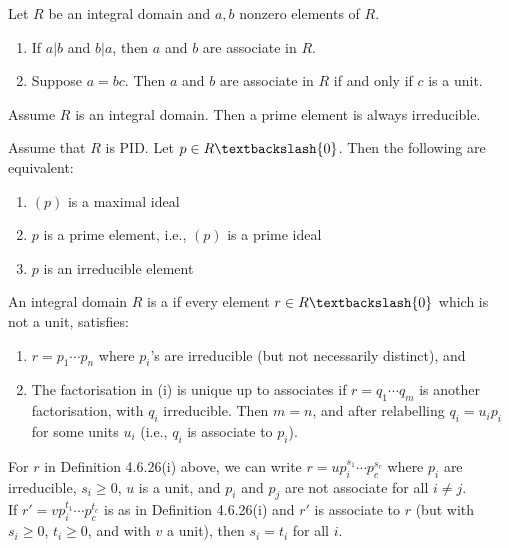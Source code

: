 \begin{proposition}
Let $R$ be an integral domain and $a,b$ nonzero elements of $R$.	
\begin{enumerate}[label=(\roman*)]
\item If $a|b$ and $b|a$, then $a$ and $b$ are associate in $R$.
\item Suppose $a=bc$. Then $a$ and $b$ are associate in $R$ if and only if $c$ is a unit.
\end{enumerate}
\end{proposition}

\begin{proposition}
Assume $R$ is an integral domain. Then a prime element is always irreducible.	
\end{proposition}

\begin{proposition}
Assume that $R$ is PID. Let $p \in R \textbackslash \{0\}$. Then the following are equivalent:
\begin{enumerate}[label=(\roman*)]
\item $(p)$ is a maximal ideal
\item $p$ is a prime element, i.e., $(p)$ is a prime ideal
\item $p$ is an irreducible element
\end{enumerate}
\end{proposition}

\begin{definition}
An integral domain $R$ is a  if every element $r \in R \textbackslash \{0\}$ which is not a unit, satisfies:
\begin{enumerate}[label=(\roman*)]
\item {} $r=p_1 \cdots p_n$ where $p_i$'s are irreducible (but not necessarily distinct), and
\item {} The factorisation in (i) is unique up to associates if $r=q_1 \cdots q_m$ is another factorisation, with $q_i$ irreducible. Then $m=n$, and after relabelling $q_i = u_i p_i$ for some units $u_i$ (i.e., $q_i$ is associate to $p_i$).
\end{enumerate}
\end{definition}

\begin{proposition}
For $r$ in Definition 4.6.26(i) above, we can write $r=u p_i^{s_1} \cdots p_c^{s_c}$ where $p_i$ are irreducible, $s_i \geq 0$, $u$ is a unit, and $p_i$ and $p_j$ are not associate for all $i \neq j$.\\
If $r'=v p_i^{t_1} \cdots p_c^{t_c}$ is as in Definition 4.6.26(i) and $r'$ is associate to $r$ (but with $s_i \geq 0$, $t_i \geq 0$, and with $v$ a unit), then $s_i = t_i$ for all $i$.
\end{proposition}

